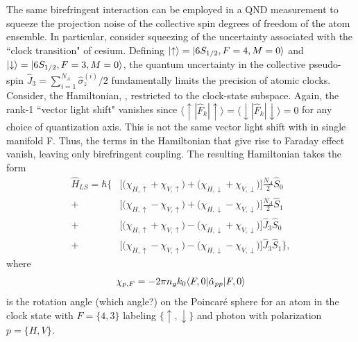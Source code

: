 \documentclass[preprint,aps,pra,onecolumn]{revtex4-1} %
\newcommand{\comment}[1]{{\color{Maroon} #1}}
\begin{document}
The same birefringent interaction can be employed in a QND measurement to squeeze the projection noise of the collective spin degrees of freedom of the atom ensemble.  In particular, consider squeezing of the uncertainty associated with the ``clock transition" of cesium.  Defining $\lvert{\uparrow}\rangle = \lvert{6S_{1/2}, F=4, M=0}\rangle$ and $\lvert{\downarrow}\rangle = \lvert{6S_{1/2}, F=3, M=0}\rangle$, the quantum uncertainty in the collective pseudo-spin $\hat{J}_3 = \sum_{i=1}^{N_A} \hat{\sigma}_z^{(i)}/2$ fundamentally limits the precision of atomic clocks.  Consider, the Hamiltonian, , restricted to the clock-state subspace. Again, the  rank-1 ``vector light shift" vanishes since $\langle \uparrow | \hat{F}_k |\uparrow \rangle =\langle \downarrow | \hat{F}_k |\downarrow \rangle = 0$ for any choice of quantization axis. \comment{This is not the same vector light shift with in single manifold F}.  Thus, the terms in the Hamiltonian that give rise to Faraday effect vanish, leaving only birefringent coupling. The resulting Hamiltonian takes the form
\begin{align} \label{Eq::ClockHamiltonian}
\hat{H}_{LS} = \hbar \Big\{ & \big[ \big( \chi_{H,\uparrow} +\chi_{V,\uparrow} \big) + \big( \chi_{H,\downarrow}+ \chi_{V,\downarrow}\big) \big] \frac{N_A}{2} \hat{S}_0  \\
+ & \big[ \big( \chi_{H, \uparrow} - \chi_{V,\uparrow} \big) + \big(\chi_{H,\downarrow} - \chi_{V,\downarrow} \big)\big]  \frac{N_A}{2}\hat{S}_1 \nonumber \\
+ & \big[ \big( \chi_{H,\uparrow} +\chi_{V,\uparrow} \big) - \big( \chi_{H,\downarrow} + \chi_{V,\downarrow}\big) \big] \hat{J}_3 \hat{S}_0 \nonumber \\
+ & \big[  \big( \chi_{H, \uparrow} - \chi_{V,\uparrow} \big) - \big(\chi_{H,\downarrow} - \chi_{V,\downarrow} \big) \big]  \hat{J}_3 \hat{S}_1\Big\}, \nonumber
\end{align}
where 
\begin{equation} \label{Eq::ClockCouplingStrength}
\chi_{p,F} = - 2\pi n_g k_0 \langle{F,0}\rvert\hat{\alpha}_{pp}  \lvert{F,0}\rangle
\end{equation}
is the rotation angle \comment{(which angle?)} on the Poincar\'{e} sphere for an atom in the clock state with $F=\{4,3\}$ labeling $\{\uparrow,\downarrow\}$ and photon with polarization $p = \{H,V\}$. 
\end{document}
